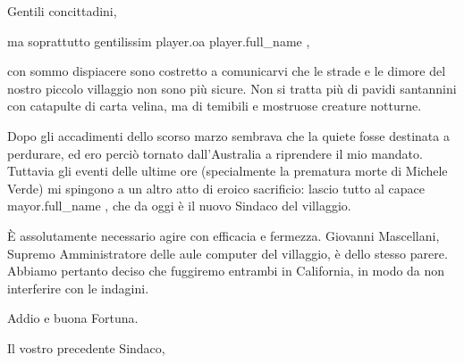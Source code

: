 \documentclass{letter}
\date{18 novembre 2014}
\begin{document}
\begin{letter}{}
\opening{Gentili concittadini,}

ma soprattutto gentilissim{{ player.oa }} {{ player.full_name }},

con sommo dispiacere sono costretto a comunicarvi che le strade e le dimore del nostro piccolo villaggio non sono più sicure.
Non si tratta più di pavidi santannini con catapulte di carta velina, ma di temibili e mostruose creature notturne.

Dopo gli accadimenti dello scorso marzo sembrava che la quiete fosse destinata a perdurare, ed ero perciò tornato dall'Australia a riprendere il mio mandato.
Tuttavia gli eventi delle ultime ore (specialmente la prematura morte di Michele Verde) mi spingono a un altro atto di eroico sacrificio: lascio tutto al capace {{ mayor.full_name }}, che da oggi è il nuovo Sindaco del villaggio.

È assolutamente necessario agire con efficacia e fermezza.
Giovanni Mascellani, Supremo Amministratore delle aule computer del villaggio, è dello stesso parere. Abbiamo pertanto deciso che fuggiremo entrambi in California, in modo da non interferire con le indagini.

Addio e buona Fortuna.

\closing{Il vostro precedente Sindaco,}

\end{letter}
\end{document}
